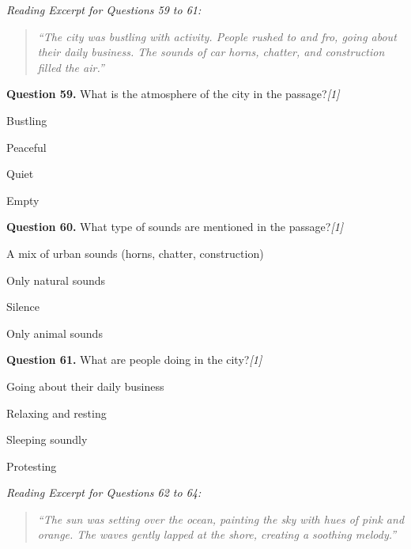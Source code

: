 \documentclass[11pt,a4paper]{article}
\newcommand{\pts}[1]{\hfill   \textit{[#1]}}
\begin{document}
\bigskip



\noindent   \textit{Reading Excerpt for Questions 59 to 61:}

\begin{quote}
   \textit{``The city was bustling with activity. People rushed to and fro, going about their daily business. The sounds of car horns, chatter, and construction filled the air.''}
\end{quote}
\smallskip




\noindent   \textbf{Question 59.} What is the atmosphere of the city in the passage?\pts{1}

\begin{parts}
  \item Bustling
  \item Peaceful
  \item Quiet
  \item Empty
\end{parts}

\medskip




\noindent   \textbf{Question 60.} What type of sounds are mentioned in the passage?\pts{1}

\begin{parts}
  \item A mix of urban sounds (horns, chatter, construction)
  \item Only natural sounds
  \item Silence
  \item Only animal sounds
\end{parts}

\medskip




\noindent   \textbf{Question 61.} What are people doing in the city?\pts{1}

\begin{parts}
  \item Going about their daily business
  \item Relaxing and resting
  \item Sleeping soundly
  \item Protesting
\end{parts}

\bigskip



\noindent   \textit{Reading Excerpt for Questions 62 to 64:}

\begin{quote}
   \textit{``The sun was setting over the ocean, painting the sky with hues of pink and orange. The waves gently lapped at the shore, creating a soothing melody.''}
\end{quote}
\smallskip
\end{document}
